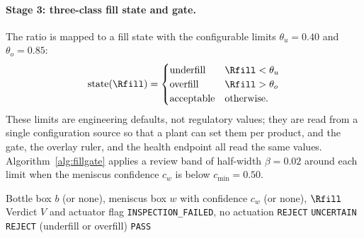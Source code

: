 \paragraph{Stage 3: three-class fill state and gate.} The ratio is mapped to a fill state with the configurable limits $\theta_u=0.40$ and $\theta_o=0.85$:
\begin{equation}
    \text{state}(\Rfill) = \begin{cases}
    \text{underfill} & \Rfill<\theta_u\\
    \text{overfill} & \Rfill>\theta_o\\
    \text{acceptable} & \text{otherwise.}
    \end{cases}
    \label{eq:fillstate}
\end{equation}
These limits are engineering defaults, not regulatory values; they are read from a single configuration source so that a plant can set them per product, and the gate, the overlay ruler, and the health endpoint all read the same values. Algorithm~\ref{alg:fillgate} applies a review band of half-width $\beta=0.02$ around each limit when the meniscus confidence $c_w$ is below $c_{\min}=0.50$.

\begin{algorithm}[htbp]
\caption{Fill gate}
\label{alg:fillgate}
\begin{algorithmic}[1]
\Require Bottle box $b$ (or none), meniscus box $w$ with confidence $c_w$ (or none), $\Rfill$
\Ensure Verdict $V$ and actuator flag
    \State \Return \texttt{INSPECTION\_FAILED}, no actuation 
    \State \Return \texttt{REJECT} 
    \State \Return \texttt{UNCERTAIN} 
    \State \Return \texttt{REJECT} (underfill or overfill)
\Else
    \State \Return \texttt{PASS}
\EndIf
\end{algorithmic}
\end{algorithm}

